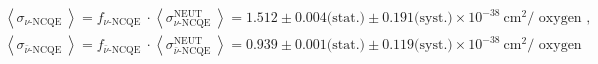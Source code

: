 \begin{equation}
    \begin{aligned}
    & \left\langle\sigma_{\nu \text {-NCQE }}\right\rangle=f_{\nu \text {-NCQE }} \cdot\left\langle\sigma_{\nu \text {-NCQE }}^{\mathrm{NEUT}}\right\rangle=1.512 \pm 0.004 \text {(stat.)} \pm 0.191 \text {(syst.)} \times 10^{-38} \mathrm{~cm}^2 / \text { oxygen }, \\
    & \left\langle\sigma_{\bar{\nu} \text {-NCQE }}\right\rangle=f_{\bar{\nu} \text {-NCQE }} \cdot\left\langle\sigma_{\bar{\nu} \text {-NCQE }}^{\mathrm{NEUT}}\right\rangle=0.939 \pm 0.001 \text {(stat.)} \pm 0.119 \text {(syst.)} \times 10^{-38} \mathrm{~cm}^2 / \text { oxygen }
    \end{aligned}
\label{eq:xsec_value}
\end{equation}



